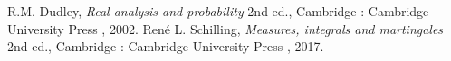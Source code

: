 \documentclass[12pt,a4paper]{jsarticle}
\begin{document}
\begin{thebibliography}{99}
    R.M. Dudley,
    \textit{Real analysis and probability} 2nd ed.,
    Cambridge : Cambridge University Press , 2002.
    Ren\'{e} L. Schilling,
    \textit{Measures, integrals and martingales} 2nd ed.,
    Cambridge : Cambridge University Press , 2017.
\end{thebibliography}
\end{document}

